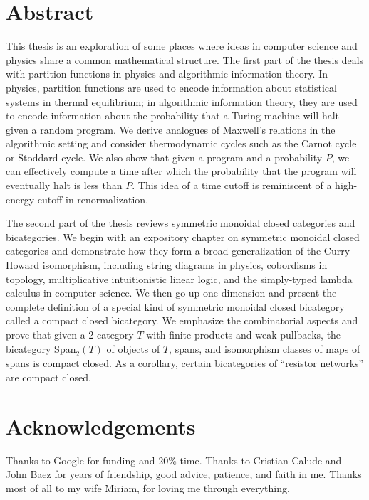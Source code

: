 \documentclass[12pt,twoside,openright]{report}
\newcommand{\Span}{\mbox{Span}}
\begin{document}
  \chapter*{Abstract}
This thesis is an exploration of some places where ideas in computer science and physics share a common mathematical structure.  The first part of the thesis deals with partition functions in physics and algorithmic information theory.  In physics, partition functions are used to encode information about statistical systems in thermal equilibrium; in algorithmic information theory, they are used to encode information about the probability that a Turing machine will halt given a random program.  We derive analogues of Maxwell's relations in the algorithmic setting and consider thermodynamic cycles such as the Carnot cycle or Stoddard cycle.  We also show that given a program and a probability $P$, we can effectively compute a time after which the probability that the program will eventually halt is less than $P$.  This idea of a time cutoff is reminiscent of a high-energy cutoff in renormalization.

The second part of the thesis reviews symmetric monoidal closed categories and bicategories.   We begin with an expository chapter on symmetric monoidal closed categories and demonstrate how they form a broad generalization of the Curry-Howard isomorphism, including string diagrams in physics, cobordisms in topology, multiplicative intuitionistic linear logic, and the simply-typed lambda calculus in computer science.  We then go up one dimension and present the complete definition of a special kind of symmetric monoidal closed bicategory called a compact closed bicategory.  We emphasize the combinatorial aspects and prove that given a 2-category $T$ with finite products and weak pullbacks, the bicategory $\Span_2(T)$ of objects of $T$, spans, and isomorphism classes of maps of spans is compact closed.  As a corollary, certain bicategories of ``resistor networks'' are compact closed.


  \vfill
  \pagebreak

  \chapter*{Acknowledgements}
  Thanks to Google for funding and 20\% time.  Thanks to Cristian Calude and John Baez for years of friendship, good advice, patience, and faith in me.  Thanks most of all to my wife Miriam, for loving me through everything.
  
  \vfill
  \pagebreak
  \setcounter{page}{9}
\end{document}
